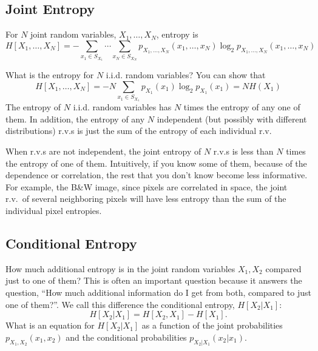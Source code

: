 \subsection{Joint Entropy}


For $N$ joint random variables, $X_1, \ldots, X_N$, entropy is
\[
  H[X_1, \ldots, X_N] = - \sum_{x_1 \in S_{X_1}} \cdots \sum_{x_N \in S_{X_N}}
     p_{X_1, \ldots, X_N}(x_1, \ldots, x_N) \log_2 p_{X_1, \ldots, X_N}(x_1, \ldots, x_N)
\]

What is the entropy for $N$ i.i.d. random variables?  You can show
that
\[
  H[X_1, \ldots, X_N] = - N \sum_{x_1 \in S_{X_1}} p_{X_1}(x_1) \log_2
  p_{X_1}(x_1) = N H(X_1)
\]
The entropy of $N$ i.i.d. random variables has $N$ times the entropy
of any one of them.  In addition, the entropy of any $N$ independent
(but possibly with different distributions) r.v.s is just the sum of
the entropy of each individual r.v.

When r.v.s are not independent, the joint entropy of $N$ r.v.s is
less than $N$ times the entropy of one of them.  Intuitively, if you
know some of them, because of the dependence or correlation, the
rest that you don't know become less informative.  For example, the
B\&W image, since pixels are correlated in space, the joint r.v.\ of
several neighboring pixels will have less entropy than the sum of
the individual pixel entropies.

\subsection{Conditional Entropy}

How much additional entropy is in the joint random variables $X_1,
X_2$ compared just to one of them?  This is often an important
question because it answers the question, ``How much additional
information do I get from both, compared to just one of them?''.  We
call this difference the conditional entropy, $H[X_2 | X_1]$:
\begin{equation} \label{E:ConditionalEntropy}
  H[X_2 | X_1] = H[X_2, X_1] - H[X_1].
\end{equation}
What is an equation for $H[X_2 | X_1]$ as a function of the joint
probabilities $p_{X_1,X_2}(x_1, x_2)$ and the conditional
probabilities $p_{X_2|X_1}(x_2| x_1)$.

